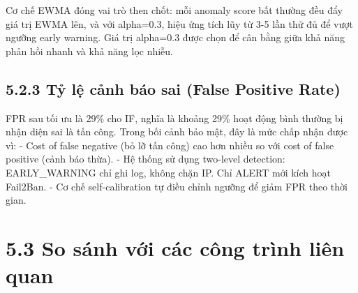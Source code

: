 \documentclass[
  a4paper]{report}
\begin{document}
Cơ chế EWMA đóng vai trò then chốt: mỗi anomaly score bất thường đều đẩy
giá trị EWMA lên, và với alpha=0.3, hiệu ứng tích lũy từ 3-5 lần thử đủ
để vượt ngưỡng early warning. Giá trị alpha=0.3 được chọn để cân bằng
giữa khả năng phản hồi nhanh và khả năng lọc nhiễu.

\subsection{5.2.3 Tỷ lệ cảnh báo sai (False Positive
Rate)}\label{tux1ef7-lux1ec7-cux1ea3nh-buxe1o-sai-false-positive-rate}

FPR sau tối ưu là 29\% cho IF, nghĩa là khoảng 29\% hoạt động bình
thường bị nhận diện sai là tấn công. Trong bối cảnh bảo mật, đây là mức
chấp nhận được vì: - Cost of false negative (bỏ lỡ tấn công) cao hơn
nhiều so với cost of false positive (cảnh báo thừa). - Hệ thống sử dụng
two-level detection: EARLY\_WARNING chỉ ghi log, không chặn IP. Chỉ
ALERT mới kích hoạt Fail2Ban. - Cơ chế self-calibration tự điều chỉnh
ngưỡng để giảm FPR theo thời gian.

\section{5.3 So sánh với các công trình liên
quan}\label{so-suxe1nh-vux1edbi-cuxe1c-cuxf4ng-truxecnh-liuxean-quan}
\end{document}
